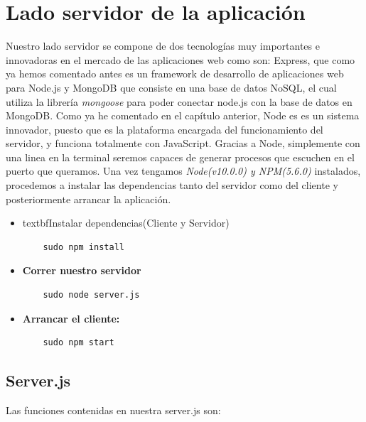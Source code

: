 \section{Lado servidor de la aplicación}

Nuestro lado servidor se compone de dos tecnologías muy importantes e innovadoras en el mercado de las aplicaciones web como son: Express, que como ya hemos comentado antes es un framework de desarrollo de aplicaciones web para Node.js y MongoDB que consiste en una base de datos NoSQL, el cual utiliza la librería \textit{mongoose} para poder conectar node.js con la base de datos en MongoDB.
Como ya he comentado en el capítulo anterior, Node es es un sistema innovador, puesto que es la plataforma encargada del funcionamiento del servidor, y funciona totalmente con JavaScript. Gracias a Node, simplemente con una linea en la terminal seremos capaces de generar procesos que escuchen en el puerto que queramos.
Una vez tengamos \textit{Node(v10.0.0) y NPM(5.6.0)} instalados, procedemos a instalar las dependencias tanto del servidor como del cliente y posteriormente arrancar la aplicación.

\begin{itemize}

\item textbf{Instalar dependencias(Cliente y Servidor)}
\begin{lstlisting}
    sudo npm install
\end{lstlisting}
\item  \textbf{Correr nuestro servidor}
\begin{lstlisting}
    sudo node server.js
\end{lstlisting}
\item  \textbf{Arrancar el cliente: }
\begin{lstlisting}
    sudo npm start
\end{lstlisting}
\end{itemize}

\subsection{Server.js}

Las funciones contenidas en nuestra server.js son:

